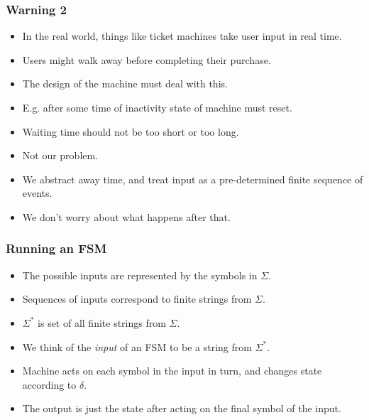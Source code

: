 \documentclass[handout]{beamer}
\begin{document}
\begin{frame}
\frametitle{Warning 2}
\begin{itemize}
\item In the real world, things like ticket machines take user input in real time.
\vspace{0.2cm}
\item Users might walk away before completing their purchase.
\vspace{0.2cm}
\item The design of the machine must deal with this.
\vspace{0.2cm}
\item E.g. after some time of inactivity state of machine must reset.
\vspace{0.2cm}
\item Waiting time should not be too short or too long.
\vspace{0.2cm}
\item Not our problem.
\vspace{0.2cm}
\item We abstract away time, and treat input as a pre-determined finite sequence of events.
\vspace{0.2cm}
\item We don't worry about what happens after that.
\end{itemize}
\end{frame}

\begin{frame}
\frametitle{Running an FSM}
\begin{itemize}
\item The possible inputs are represented by the symbols in $\Sigma$.
\vspace{0.2cm}
\item Sequences of inputs correspond to finite strings from $\Sigma$.
\vspace{0.2cm}
\item $\Sigma^*$ is set of all finite strings from $\Sigma$.
\vspace{0.2cm}
\item We think of the \emph{input} of an FSM to be a string from $\Sigma^*$.
\vspace{0.2cm}
\item Machine acts on each symbol in the input in turn, and changes state according to $\delta$.
\vspace{0.2cm}
\item The output is just the state after acting on the final symbol of the input.
\end{itemize}
\end{frame}
\end{document}
